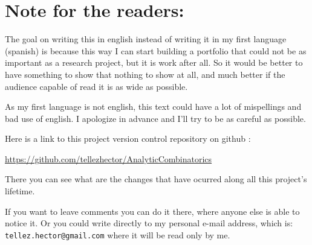 \chapter*{Note for the readers:}
    The goal on writing this in english instead of writing it in my first language (spanish) is because 
    this way I can start building a portfolio that could not be as important as a research project, but
    it is work after all. So it would be better to have something to show that nothing to show at all, 
    and much better if the audience capable of read it is as wide as possible.\pn
    
    As my first language is not english, this text could have a lot of mispellings and
    bad use of english. I apologize in advance and I'll try to be as careful as possible.\pn
    
    Here is a link to this project version control repository on github	:\par
    \href{https://github.com/tellezhector/AnalyticCombinatorics}{https://github.com/tellezhector/AnalyticCombinatorics}\par
    There you can see what are the changes that have ocurred along all this project's lifetime.\pn
    
    If you want to leave comments you can do it there, where anyone else is able to notice it. Or you could 
    write directly to my personal e-mail address, which is: \texttt{tellez.hector@gmail.com} where it will be read only
    by me.
